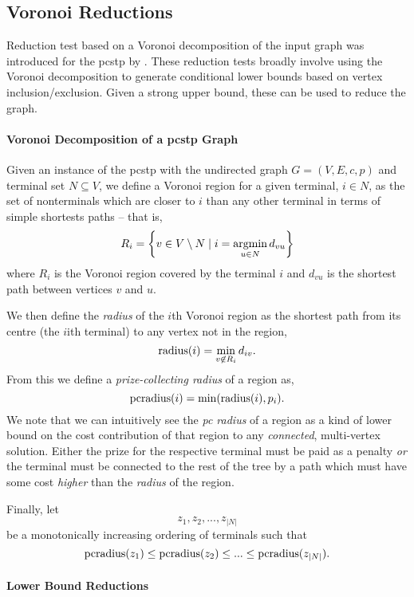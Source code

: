 \subsection{Voronoi Reductions}

Reduction test based on a Voronoi decomposition of the input graph was introduced for the \gls{pcstp} by \cite{rehfeldt2016reduction}. These reduction tests broadly
involve using the Voronoi decomposition to generate conditional lower bounds based on vertex inclusion/exclusion. Given a strong upper bound, these can be used
to reduce the graph.

\paragraph{Voronoi Decomposition of a \gls{pcstp} Graph}

Given an instance of the \gls{pcstp} with the undirected graph $G = (V, E, c, p)$ and terminal set
$N \subseteq V$, we define a Voronoi region for a given terminal, $i \in N$, as the set of nonterminals
which are closer to $i$ than any other terminal in terms of simple shortests paths -- that is,
$$R_i = \left\{v \in V \setminus N \mid i = \operatorname*{argmin}_{u \in N} d_{vu}\right\}$$
where $R_i$ is the Voronoi region covered by the terminal $i$ and $d_{vu}$ is the shortest path between vertices
$v$ and $u$.

We then define the \textit{radius} of the $i$th Voronoi region as the shortest path from its centre (the $i$ith terminal)
to any vertex not in the region,
$$\operatorname{radius}(i) = \min_{v \not\in R_i} d_{iv}\mathnormal{.}$$
From this we define a \textit{prize-collecting radius} of a region as,
$$\operatorname{pcradius}(i) = \min(\operatorname{radius}(i), p_i)\mathnormal{.}$$
We note that we can intuitively see the \textit{pc radius} of a region as a kind of lower bound
on the cost contribution
 of that region to any
 \textit{connected}, multi-vertex solution. Either the prize for the respective terminal must be paid as a penalty
 \textit{or} the terminal must be connected to the rest of the tree by a path which must have some cost \textit{higher}
 than the \textit{radius} of the region.

 Finally, let
 $$z_1, z_2, ..., z_{|N|}$$
 be a monotonically increasing ordering of terminals such that
$$\operatorname{pcradius}(z_1) \leq \operatorname{pcradius}(z_2) \leq ... \leq \operatorname{pcradius}(z_{|N|})\mathnormal{.}$$

\paragraph{Lower Bound Reductions}

